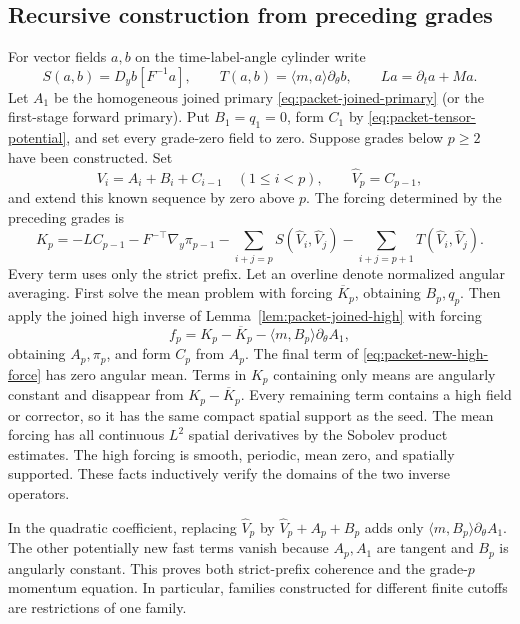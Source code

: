\documentclass[11pt]{article}
\theoremstyle{definition}
\begin{document}
\subsection{Recursive construction from preceding grades}
For vector fields $a,b$ on the time-label-angle cylinder write
\[
 S(a,b)=D_yb[F^{-1}a],\qquad
 T(a,b)=\langle m,a\rangle\partial_\theta b,\qquad
 L a=\partial_ta+Ma.
\]
Let $A_1$ be the homogeneous joined primary
\eqref{eq:packet-joined-primary} (or the first-stage forward primary).
Put $B_1=q_1=0$, form $C_1$ by
\eqref{eq:packet-tensor-potential}, and set every grade-zero field to zero.
Suppose grades below $p\ge2$ have been constructed. Set
\[
 V_i=A_i+B_i+C_{i-1}\quad(1\le i<p),\qquad
 \widehat V_p=C_{p-1},
\]
and extend this known sequence by zero above $p$. The forcing determined
by the preceding grades is
\begin{equation}\label{eq:packet-known-force}
 K_p=-LC_{p-1}-F^{-\top}\nabla_y\pi_{p-1}
       -\sum_{i+j=p}S(\widehat V_i,\widehat V_j)
       -\sum_{i+j=p+1}T(\widehat V_i,\widehat V_j).
\end{equation}
Every term uses only the strict prefix. Let an overline denote normalized
angular averaging. First solve the mean problem with forcing
$\overline K_p$, obtaining $B_p,q_p$. Then apply the joined high
inverse of Lemma~\ref{lem:packet-joined-high} with forcing
\begin{equation}\label{eq:packet-new-high-force}
 f_p=K_p-\overline K_p-\langle m,B_p\rangle\partial_\theta A_1,
\end{equation}
obtaining $A_p,\pi_p$, and form $C_p$ from $A_p$.
The final term of \eqref{eq:packet-new-high-force} has zero angular mean.
Terms in $K_p$ containing only means are angularly constant and disappear
from $K_p-\overline K_p$. Every remaining term contains a high field or
corrector, so it has the same compact spatial support as the seed. The
mean forcing has all continuous $L^2$ spatial derivatives by the
Sobolev product estimates. The high forcing is smooth, periodic, mean
zero, and spatially supported. These facts inductively verify the domains
of the two inverse operators.

In the quadratic
coefficient, replacing $\widehat V_p$ by
$\widehat V_p+A_p+B_p$ adds only
$\langle m,B_p\rangle\partial_\theta A_1$.
The other potentially new fast terms vanish because $A_p,A_1$ are
tangent and $B_p$ is angularly constant. This proves both strict-prefix
coherence and the grade-$p$ momentum equation. In particular, families
constructed for different finite cutoffs are restrictions of one family.
\end{document}

